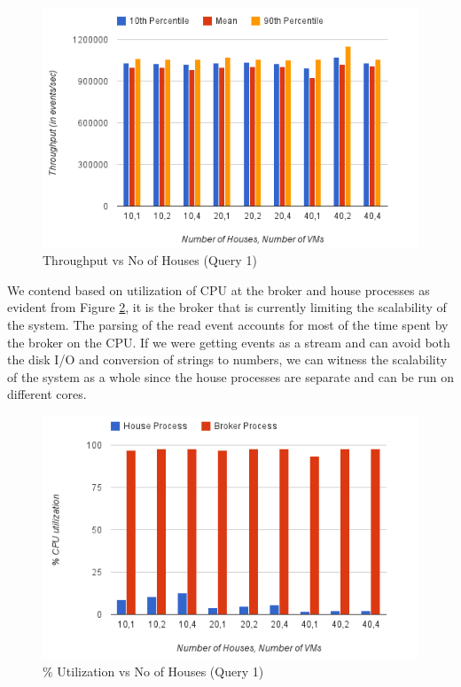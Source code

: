 \begin{figure}[h]
\begin{center}
	\includegraphics[scale=0.45]{img/q1_throughput}
	\vspace*{-0.4cm}
	\caption{Throughput vs No of Houses (Query 1)\label{fig:q1_throughput}}
\end{center}
\end{figure}

We contend based on utilization of CPU at the broker and house processes as evident from Figure \ref{fig:q1_util}, it is the broker that is currently limiting the scalability of the system.
The parsing of the read event accounts for most of the time spent by the broker on the CPU.
If we were getting events as a stream and can avoid both the disk I/O and conversion of strings to numbers, we can witness the scalability of the system as a whole since the house processes are separate and can be run on different cores.


\begin{figure}[h]
\begin{center}
	\includegraphics[scale=0.5]{img/q1_utilization}
	\vspace*{-0.4cm}
	\caption{\% Utilization vs No of Houses (Query 1)\label{fig:q1_util}}
\end{center}
\end{figure}
\vspace*{-0.4cm}
